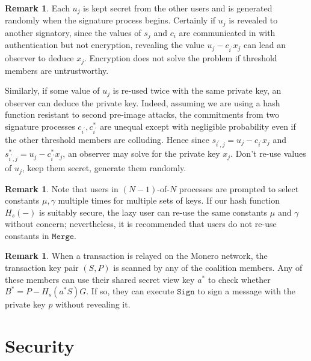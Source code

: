\documentclass{mrl}
\theoremstyle{definition}
\newtheorem{disc}[theorem]{Remark}
\begin{document}
 
 \begin{disc}
 Each $u_j$ is kept secret from the other users and is generated randomly when the signature process begins. Certainly if $u_j$ is revealed to another signatory, since the values of $s_j$ and $c_i$ are communicated in with authentication but not encryption, revealing the value $u_j - c_{i^{\prime}} x_j$ can lead an observer to deduce $x_j$. Encryption does not solve the problem if threshold members are untrustworthy.
 
 
 Similarly, if some value of $u_j$ is re-used twice with the same private key, an observer can deduce the private key. Indeed, assuming we are using a hash function resistant to second pre-image attacks, the commitments from two signature processes $c_{i^{\prime}}, c_{i^{\prime}}^*$ are unequal except with negligible probability even if the other threshold members are colluding. Hence since $s_{i^{\prime},j} = u_j - c_{i^{\prime}} x_{j}$ and $s_{i^{\prime},j}^* = u_j - c_{i^{\prime}}^* x_{j}$, an observer may solve for the private key $x_j$. Don't re-use values of $u_j$, keep them secret, generate them randomly.
 
 \end{disc}
 
 \begin{disc}  Note that users in $(N-1)$-of-$N$ processes are prompted to select constants $\mu, \gamma$ multiple times for multiple sets of keys. If our hash function $H_s(-)$ is suitably secure, the lazy user can re-use the same constants $\mu$ and $\gamma$ without concern; nevertheless, it is recommended that users do not re-use constants in $\texttt{Merge}$. 
 \end{disc}
 
 \begin{disc}
 When a transaction is relayed on the Monero network, the transaction key pair $(S,P)$ is scanned by any of the coalition members. Any of these members can use their shared secret view key $a^*$ to check whether $B^* = P - H_s(a^* S)G$. If so, they can execute $\texttt{Sign}$ to sign a message with the private key $p$ without revealing it.
 \end{disc}
 
 
 \section{Security}
 
 
\end{document}
